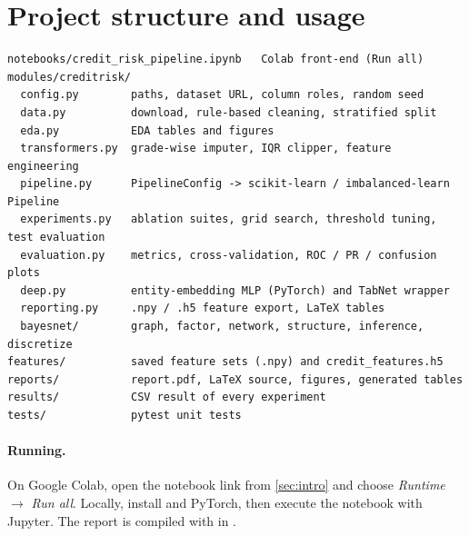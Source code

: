 \section{Project structure and usage}
\label{app:structure}

\begin{listing}[H]
  \begin{verbatim}
notebooks/credit_risk_pipeline.ipynb   Colab front-end (Run all)
modules/creditrisk/
  config.py        paths, dataset URL, column roles, random seed
  data.py          download, rule-based cleaning, stratified split
  eda.py           EDA tables and figures
  transformers.py  grade-wise imputer, IQR clipper, feature engineering
  pipeline.py      PipelineConfig -> scikit-learn / imbalanced-learn Pipeline
  experiments.py   ablation suites, grid search, threshold tuning, test evaluation
  evaluation.py    metrics, cross-validation, ROC / PR / confusion plots
  deep.py          entity-embedding MLP (PyTorch) and TabNet wrapper
  reporting.py     .npy / .h5 feature export, LaTeX tables
  bayesnet/        graph, factor, network, structure, inference, discretize
features/          saved feature sets (.npy) and credit_features.h5
reports/           report.pdf, LaTeX source, figures, generated tables
results/           CSV result of every experiment
tests/             pytest unit tests
  \end{verbatim}
  \caption{Repository layout.}
  \label{lst:layout}
\end{listing}

\paragraph{Running.}
On Google Colab, open the notebook link from \cref{sec:intro} and choose \emph{Runtime} $\to$ \emph{Run all}.
Locally, install  and PyTorch, then execute the notebook with Jupyter.
The report is compiled with  in .

